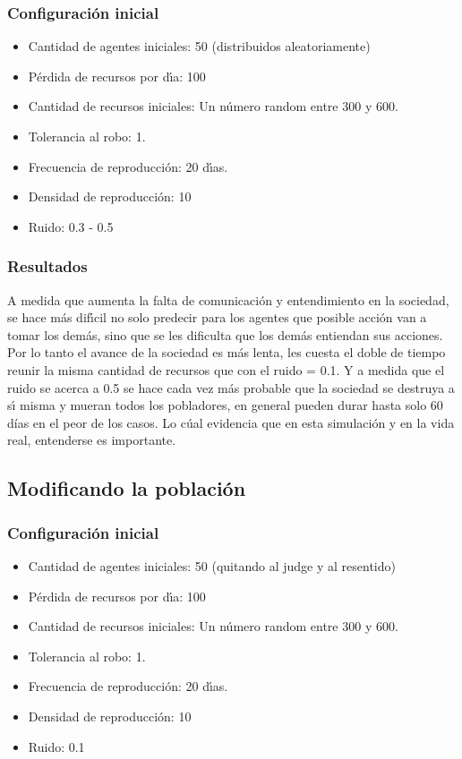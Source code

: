 \documentclass{article}
\begin{document}
\subsubsection{Configuraci\'on inicial}
\begin{itemize}
      \item Cantidad de agentes iniciales: 50 (distribuidos aleatoriamente)
      \item P\'erdida de recursos por d\'{\i}a: 100
      \item Cantidad de recursos iniciales: Un n\'umero random entre 300 y 600.
      \item Tolerancia al robo: 1.
      \item Frecuencia de reproducci\'on: 20 d\'{\i}as.
      \item Densidad de reproducci\'on: 10
      \item Ruido: 0.3 - 0.5
\end{itemize}

\subsubsection{Resultados}
A medida que aumenta la falta de comunicaci\'on y entendimiento en la sociedad, se hace m\'as dif\'{\i}cil no solo predecir para los agentes que posible acci\'on van a tomar
los dem\'as, sino que se les dificulta que los dem\'as entiendan sus acciones. Por lo tanto el avance de la sociedad es m\'as lenta, les cuesta el doble de tiempo reunir la misma
cantidad de recursos que con el ruido = 0.1. Y a medida que el ruido se acerca a 0.5 se hace cada vez m\'as probable que la sociedad se destruya a s\'{\i} misma y mueran todos los
pobladores, en general pueden durar hasta solo 60 d\'ias en el peor de los casos. Lo c\'ual evidencia que en esta simulación y en la vida real, entenderse es importante.

\subsection{Modificando la poblaci\'on}
\subsubsection{Configuraci\'on inicial}
\begin{itemize}
      \item Cantidad de agentes iniciales: 50 (quitando al judge y al resentido)
      \item P\'erdida de recursos por d\'{\i}a: 100
      \item Cantidad de recursos iniciales: Un n\'umero random entre 300 y 600.
      \item Tolerancia al robo: 1.
      \item Frecuencia de reproducci\'on: 20 d\'{\i}as.
      \item Densidad de reproducci\'on: 10
      \item Ruido: 0.1
\end{itemize}
\end{document}
